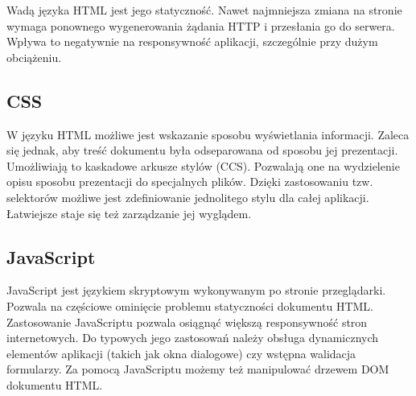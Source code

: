 Wadą języka HTML jest jego statyczność. Nawet najmniejsza zmiana na stronie wymaga ponownego wygenerowania żądania HTTP i przesłania go do serwera. Wpływa to negatywnie na responsywność aplikacji, szczególnie przy dużym obciążeniu. 

\subsection[CSS][CSS]{CSS}
W języku HTML możliwe jest wskazanie sposobu wyświetlania informacji. Zaleca się jednak, aby treść dokumentu była odseparowana od sposobu jej prezentacji. Umożliwiają to kaskadowe arkusze stylów (CCS). Pozwalają one na wydzielenie opisu sposobu prezentacji do specjalnych plików. Dzięki zastosowaniu tzw. selektorów możliwe jest zdefiniowanie jednolitego stylu dla całej aplikacji. Łatwiejsze staje się też zarządzanie jej wyglądem.

\subsection[JavaScript][JavaScript]{JavaScript}
JavaScript jest językiem skryptowym wykonywanym po stronie przeglądarki. Pozwala na częściowe ominięcie problemu statyczności dokumentu HTML. Zastosowanie JavaScriptu pozwala osiągnąć większą responsywność stron internetowych. Do typowych jego zastosowań należy obsługa dynamicznych elementów aplikacji (takich jak okna dialogowe) czy wstępna walidacja formularzy. Za pomocą JavaScriptu możemy też manipulować drzewem DOM dokumentu HTML.

